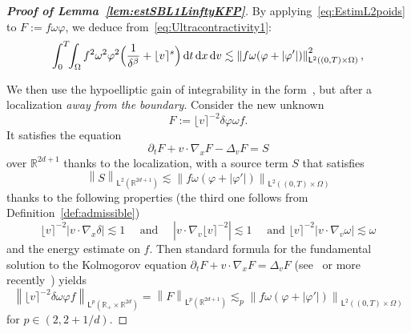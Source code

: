 \documentclass[11pt]{amsart}
\theoremstyle{definition}
\theoremstyle{remark}
\numberwithin{equation}{section}
\newcommand\R{{\mathbb R}}
\newcommand{\dd}{{\, \mathrm d}}
\newcommand{\sfL}{\mathsf{L}}
\newcommand{\wangle}[1]{\lfloor #1 \rceil}
\begin{document}
\begin{proof}[{\bf Proof of Lemma~\ref{lem:estSBL1LinftyKFP}}]
By applying~\eqref{eq:EstimL2poids} to $F:=f\omega \varphi$, we deduce from~\eqref{eq:Ultracontractivity1}:
\begin{equation}
  \label{eq:hypo1}
  \int_0^T\!\!\int_\Omega f^2 \omega^2 \varphi^2 \Bigl( \frac{1}{\delta^{\beta}} +  \wangle{v}^s  \Bigr) \dd t \dd x \dd v 
  \lesssim \left\| f \omega (\varphi +|\varphi '|) \right\|^2 _{\sfL^2((0,T) \times \Omega)},
\end{equation}

We then use the hypoelliptic gain of integrability in the form~\cite{MR2068847,MR3923847}, but after a localization \emph{away from the boundary}. Consider the new unknown
\begin{equation*}
  F := \wangle{v}^{-2} \delta \varphi \omega f.
\end{equation*}
It satisfies the equation
\begin{equation*}
  \partial_t F + v \cdot \nabla_x F - \Delta_v F = S
\end{equation*}
over $\R^{2d+1}$ thanks to the localization, with a source term $S$ that satisfies 
\begin{equation*}
  \left\| S \right\|_{\sfL^2(\R^{2d+1})} \lesssim \left\| f \omega (\varphi + |\varphi'|) \right\|_{\sfL^2((0,T) \times \Omega)}
\end{equation*}
thanks to the following properties (the third one follows from Definition~\ref{def:admissible})
\begin{equation*}
   \wangle{v}^{-2} \left| v \cdot \nabla_x \delta \right| \lesssim 1 \quad \text{ and } \quad \left| v \cdot \nabla_v \wangle{v}^{-2} \right| \lesssim 1 \quad \text{ and } \wangle{v}^{-2} \left| v \cdot \nabla_v \omega \right| \lesssim \omega
\end{equation*}
and the energy estimate on $f$. Then standard formula for the fundamental solution to the Kolmogorov equation $\partial_t F + v \cdot \nabla_x F = \Delta_v F$ (see~\cite{MR2068847} or more recently~\cite[Lemma~10]{MR4453413}) yields
\begin{equation}
  \label{eq:hypo2}
  \left\| \wangle{v}^{-2} \delta \omega \varphi f \right\|_{\sfL^{p}(\R_+ \times \R^{2d})} = \left\| F \right\|_{\sfL^{p}(\R^{2d+1})} \lesssim_p \left\| f \omega (\varphi + |\varphi'|) \right\|_{\sfL^2((0,T) \times \Omega)}
\end{equation}
for $p \in (2,2+1/d)$.


\end{proof}
\end{document}
